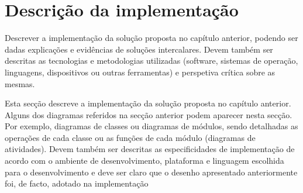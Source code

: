 \section{Descri\c{c}\~ao da implementa\c{c}\~ao} %
\label{sec:impl_desc}

Descrever a implementação da solução proposta no capítulo anterior, podendo ser dadas explicações e evidências de soluções intercalares. Devem também ser descritas as tecnologias e metodologias utilizadas (software, sistemas de operação, linguagens, dispositivos ou outras ferramentas) e perspetiva crítica sobre as mesmas.

Esta secção descreve a implementação da solução proposta no capítulo anterior. Alguns dos diagramas referidos na secção anterior podem aparecer nesta secção. Por exemplo, diagramas de classes ou diagramas de módulos, sendo detalhadas as operações de cada classe ou as funções de cada módulo (diagramas de atividades). Devem também ser descritas as especificidades de implementação de acordo com o ambiente de desenvolvimento, plataforma e linguagem escolhida para o desenvolvimento e deve ser claro que o desenho apresentado anteriormente foi, de facto, adotado na implementação

